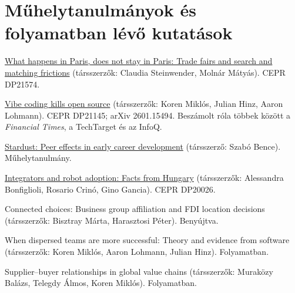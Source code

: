 \documentclass[10pt,a4paper]{article}
\begin{document}
\section{Műhelytanulmányok és folyamatban lévő kutatások}
\begin{cvlist}
  \item[2026] \href{https://cepr.org/publications/dp21574}{What happens in Paris, does not stay in Paris: Trade fairs and search and matching frictions} (társszerzők: Claudia Steinwender, Molnár Mátyás). CEPR DP21574.
  \item[2026] \href{https://cepr.org/publications/dp21145}{Vibe coding kills open source} (társszerzők: Koren Miklós, Julian Hinz, Aaron Lohmann). CEPR DP21145; arXiv 2601.15494. Beszámolt róla többek között a \textit{Financial Times}, a TechTarget és az InfoQ.
  \item[2025] \href{https://papers.ssrn.com/sol3/papers.cfm?abstract_id=5378338}{Stardust: Peer effects in early career development} (társszerző: Szabó Bence). Műhelytanulmány.
  \item[2025] \href{https://cepr.org/publications/dp20026}{Integrators and robot adoption: Facts from Hungary} (társszerzők: Alessandra Bonfiglioli, Rosario Crinó, Gino Gancia). CEPR DP20026.
  \item[] Connected choices: Business group affiliation and FDI location decisions (társszerzők: Bisztray Márta, Harasztosi Péter). Benyújtva.
  \item[] When dispersed teams are more successful: Theory and evidence from software (társszerzők: Koren Miklós, Aaron Lohmann, Julian Hinz). Folyamatban.
  \item[] Supplier--buyer relationships in global value chains (társszerzők: Muraközy Balázs, Telegdy Álmos, Koren Miklós). Folyamatban.
\end{cvlist}

\end{document}
